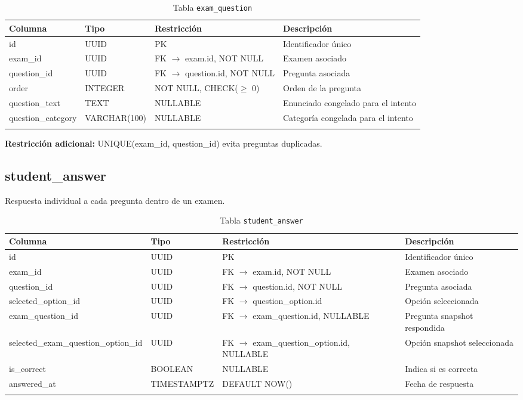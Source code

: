 \begin{longtable}{l l l p{5cm}}
\toprule
\textbf{Columna} & \textbf{Tipo} & \textbf{Restricción} & \textbf{Descripción} \\
\midrule
\endhead
id & UUID & PK & Identificador único \\
exam\_id & UUID & FK $\rightarrow$ exam.id, NOT NULL & Examen asociado \\
question\_id & UUID & FK $\rightarrow$ question.id, NOT NULL & Pregunta asociada \\
order & INTEGER & NOT NULL, CHECK($\ge$ 0) & Orden de la pregunta \\
question\_text & TEXT & NULLABLE & Enunciado congelado para el intento \\
question\_category & VARCHAR(100) & NULLABLE & Categoría congelada para el intento \\
\bottomrule
\caption{Tabla \texttt{exam\_question}}
\end{longtable}

\textbf{Restricción adicional:} UNIQUE(exam\_id, question\_id) evita preguntas duplicadas.

\subsection{student\_answer}

Respuesta individual a cada pregunta dentro de un examen.

\begin{longtable}{l l l p{5cm}}
\toprule
\textbf{Columna} & \textbf{Tipo} & \textbf{Restricción} & \textbf{Descripción} \\
\midrule
\endhead
id & UUID & PK & Identificador único \\
exam\_id & UUID & FK $\rightarrow$ exam.id, NOT NULL & Examen asociado \\
question\_id & UUID & FK $\rightarrow$ question.id, NOT NULL & Pregunta asociada \\
selected\_option\_id & UUID & FK $\rightarrow$ question\_option.id & Opción seleccionada \\
exam\_question\_id & UUID & FK $\rightarrow$ exam\_question.id, NULLABLE & Pregunta snapshot respondida \\
selected\_exam\_question\_option\_id & UUID & FK $\rightarrow$ exam\_question\_option.id, NULLABLE & Opción snapshot seleccionada \\
is\_correct & BOOLEAN & NULLABLE & Indica si es correcta \\
answered\_at & TIMESTAMPTZ & DEFAULT NOW() & Fecha de respuesta \\
\bottomrule
\caption{Tabla \texttt{student\_answer}}
\end{longtable}

